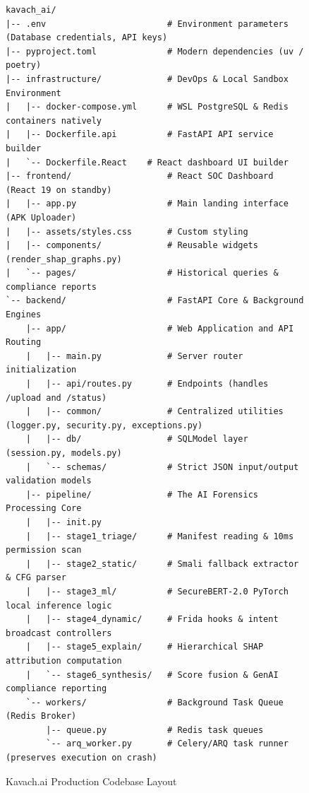 \documentclass[10pt,a4paper]{article}
\begin{document}
\begin{figure}[H]
\centering
\begin{minipage}{0.95\linewidth}
\small
\begin{verbatim}
kavach_ai/
|-- .env                        # Environment parameters (Database credentials, API keys)
|-- pyproject.toml              # Modern dependencies (uv / poetry)
|-- infrastructure/             # DevOps & Local Sandbox Environment
|   |-- docker-compose.yml      # WSL PostgreSQL & Redis containers natively
|   |-- Dockerfile.api          # FastAPI API service builder
|   `-- Dockerfile.React    # React dashboard UI builder
|-- frontend/                   # React SOC Dashboard (React 19 on standby)
|   |-- app.py                  # Main landing interface (APK Uploader)
|   |-- assets/styles.css       # Custom styling
|   |-- components/             # Reusable widgets (render_shap_graphs.py)
|   `-- pages/                  # Historical queries & compliance reports
`-- backend/                    # FastAPI Core & Background Engines
    |-- app/                    # Web Application and API Routing
    |   |-- main.py             # Server router initialization
    |   |-- api/routes.py       # Endpoints (handles /upload and /status)
    |   |-- common/             # Centralized utilities (logger.py, security.py, exceptions.py)
    |   |-- db/                 # SQLModel layer (session.py, models.py)
    |   `-- schemas/            # Strict JSON input/output validation models
    |-- pipeline/               # The AI Forensics Processing Core
    |   |-- init.py
    |   |-- stage1_triage/      # Manifest reading & 10ms permission scan
    |   |-- stage2_static/      # Smali fallback extractor & CFG parser
    |   |-- stage3_ml/          # SecureBERT-2.0 PyTorch local inference logic
    |   |-- stage4_dynamic/     # Frida hooks & intent broadcast controllers
    |   |-- stage5_explain/     # Hierarchical SHAP attribution computation
    |   `-- stage6_synthesis/   # Score fusion & GenAI compliance reporting
    `-- workers/                # Background Task Queue (Redis Broker)
        |-- queue.py            # Redis task queues
        `-- arq_worker.py       # Celery/ARQ task runner (preserves execution on crash)
\end{verbatim}
\end{minipage}
\caption{Kavach.ai Production Codebase Layout}
\label{fig:codebase_layout}
\end{figure}


\newpage
\end{document}
